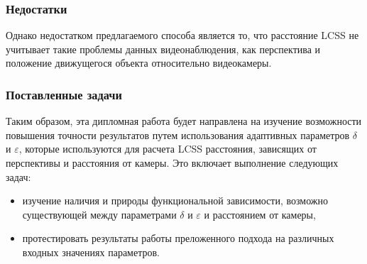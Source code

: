 \subsubsection{Недостатки}

Однако недостатком предлагаемого способа является то, что расстояние LCSS не учитывает такие проблемы данных видеонаблюдения, как перспектива и положение движущегося объекта относительно видеокамеры.

\subsubsection{Поставленные задачи}

Таким образом, эта дипломная работа будет направлена на изучение возможности повышения точности результатов путем использования адаптивных параметров $\delta$ и $\varepsilon$, которые используются для расчета LCSS расстояния, зависящих от перспективы и расстояния от камеры. Это включает выполнение следующих задач:

\begin{itemize}
	\item изучение наличия и природы функциональной зависимости, возможно существующей между параметрами $\delta$ и $\varepsilon$ и расстоянием от камеры,
	\item протестировать результаты работы преложенного подхода на различных входных значениях параметров.
\end{itemize}